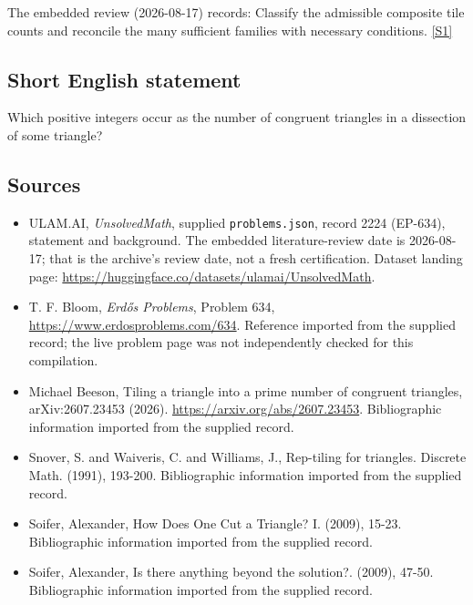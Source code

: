 \documentclass[11pt,a4paper]{article}
\newcommand{\sref}[2]{\hyperlink{source:#1:#2}{[S#2]}}
\begin{document}
The embedded review (2026-08-17) records: Classify the admissible composite tile counts and reconcile the many sufficient families with necessary conditions. \sref{2224}{1}

\subsection{Short English statement}

Which positive integers occur as the number of congruent triangles in a dissection of some triangle?

\subsection{Sources}

{\small

\begin{itemize}

\item[\hypertarget{source:2224:1}{S1}] ULAM.AI, \emph{UnsolvedMath}, supplied \texttt{problems.json}, record 2224 (EP-634), statement and background. The embedded literature-review date is 2026-08-17; that is the archive’s review date, not a fresh certification. Dataset landing page: \url{https://huggingface.co/datasets/ulamai/UnsolvedMath}.

\item[\hypertarget{source:2224:2}{S2}] T. F. Bloom, \emph{Erdős Problems}, Problem 634, \url{https://www.erdosproblems.com/634}. Reference imported from the supplied record; the live problem page was not independently checked for this compilation.

\item[\hypertarget{source:2224:3}{S3}] Michael Beeson, Tiling a triangle into a prime number of congruent triangles, arXiv:2607.23453 (2026). \url{https://arxiv.org/abs/2607.23453}. Bibliographic information imported from the supplied record.

\item[\hypertarget{source:2224:4}{S4}] Snover, S. and Waiveris, C. and Williams, J., Rep-tiling for triangles. Discrete Math. (1991), 193-200. Bibliographic information imported from the supplied record.

\item[\hypertarget{source:2224:5}{S5}] Soifer, Alexander, How Does One Cut a Triangle? I. (2009), 15-23. Bibliographic information imported from the supplied record.

\item[\hypertarget{source:2224:6}{S6}] Soifer, Alexander, Is there anything beyond the solution?. (2009), 47-50. Bibliographic information imported from the supplied record.

\end{itemize}

}

\label{end:2224}
\end{document}
